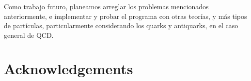 \documentclass[11pt,a4paper,twoside,pdf]{article}
\numberwithin{equation}{section}
\begin{document}
Como trabajo futuro, planeamos arreglar los problemas mencionados anteriormente, e implementar y
probar el programa con otras teor\'ias, y m\'as tipos de part\'iculas, particularmente
considerando los quarks y antiquarks, en el caso general de QCD.

\newpage
\section{Acknowledgements}



\newpage
\appendix

\newpage

\end{document}
